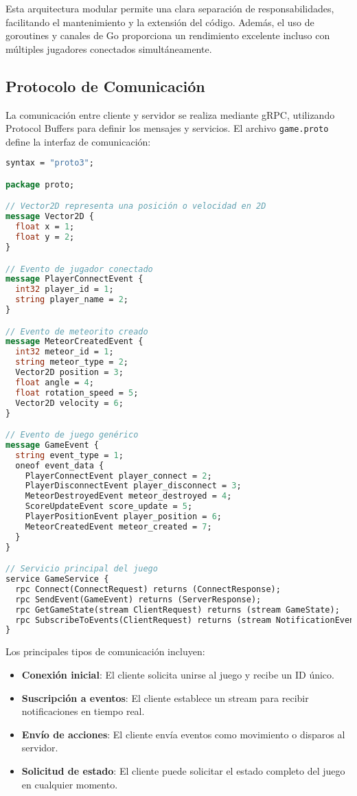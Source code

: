 \documentclass[12pt,letterpaper]{article}
\begin{document}
Esta arquitectura modular permite una clara separación de responsabilidades, facilitando el mantenimiento y la extensión del código. Además, el uso de goroutines y canales de Go proporciona un rendimiento excelente incluso con múltiples jugadores conectados simultáneamente.

\subsection{Protocolo de Comunicación}

La comunicación entre cliente y servidor se realiza mediante gRPC, utilizando Protocol Buffers para definir los mensajes y servicios. El archivo \texttt{game.proto} define la interfaz de comunicación:

\begin{lstlisting}[language=proto, caption=Extracto de game.proto con definiciones principales]
syntax = "proto3";

package proto;

// Vector2D representa una posición o velocidad en 2D
message Vector2D {
  float x = 1;
  float y = 2;
}

// Evento de jugador conectado
message PlayerConnectEvent {
  int32 player_id = 1;
  string player_name = 2;
}

// Evento de meteorito creado
message MeteorCreatedEvent {
  int32 meteor_id = 1;
  string meteor_type = 2;
  Vector2D position = 3;
  float angle = 4;
  float rotation_speed = 5;
  Vector2D velocity = 6;
}

// Evento de juego genérico
message GameEvent {
  string event_type = 1;
  oneof event_data {
    PlayerConnectEvent player_connect = 2;
    PlayerDisconnectEvent player_disconnect = 3;
    MeteorDestroyedEvent meteor_destroyed = 4;
    ScoreUpdateEvent score_update = 5;
    PlayerPositionEvent player_position = 6;
    MeteorCreatedEvent meteor_created = 7;
  }
}

// Servicio principal del juego
service GameService {
  rpc Connect(ConnectRequest) returns (ConnectResponse);
  rpc SendEvent(GameEvent) returns (ServerResponse);
  rpc GetGameState(stream ClientRequest) returns (stream GameState);
  rpc SubscribeToEvents(ClientRequest) returns (stream NotificationEvent);
}
\end{lstlisting}

Los principales tipos de comunicación incluyen:

\begin{itemize}
    \item \textbf{Conexión inicial}: El cliente solicita unirse al juego y recibe un ID único.
    \item \textbf{Suscripción a eventos}: El cliente establece un stream para recibir notificaciones en tiempo real.
    \item \textbf{Envío de acciones}: El cliente envía eventos como movimiento o disparos al servidor.
    \item \textbf{Solicitud de estado}: El cliente puede solicitar el estado completo del juego en cualquier momento.
\end{itemize}
\end{document}
